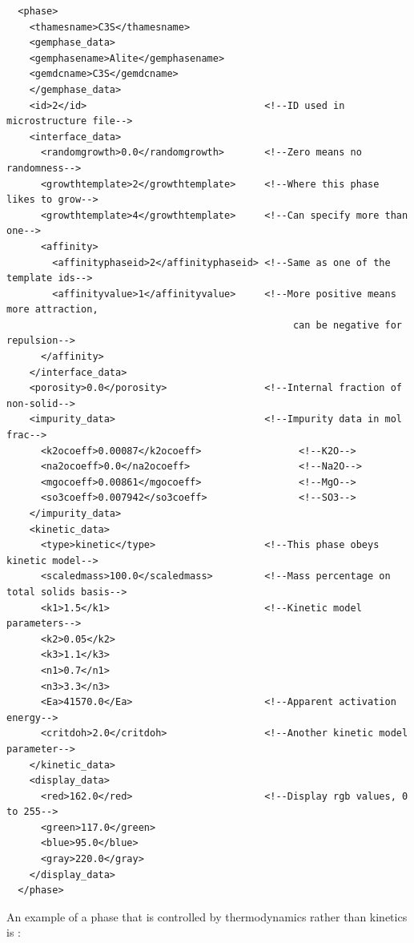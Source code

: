 \documentclass{article}
\begin{document}
\scriptsize{
    \begin{lstlisting}
  <phase>
    <thamesname>C3S</thamesname>
    <gemphase_data>
    <gemphasename>Alite</gemphasename>
    <gemdcname>C3S</gemdcname>
    </gemphase_data>
    <id>2</id>                               <!--ID used in microstructure file-->
    <interface_data>
      <randomgrowth>0.0</randomgrowth>       <!--Zero means no randomness-->
      <growthtemplate>2</growthtemplate>     <!--Where this phase likes to grow-->
      <growthtemplate>4</growthtemplate>     <!--Can specify more than one-->
      <affinity>
        <affinityphaseid>2</affinityphaseid> <!--Same as one of the template ids-->
        <affinityvalue>1</affinityvalue>     <!--More positive means more attraction,
                                                  can be negative for repulsion-->
      </affinity>
    </interface_data>
    <porosity>0.0</porosity>                 <!--Internal fraction of non-solid-->
    <impurity_data>                          <!--Impurity data in mol frac-->
      <k2ocoeff>0.00087</k2ocoeff>                 <!--K2O-->
      <na2ocoeff>0.0</na2ocoeff>                   <!--Na2O-->
      <mgocoeff>0.00861</mgocoeff>                 <!--MgO-->
      <so3coeff>0.007942</so3coeff>                <!--SO3-->
    </impurity_data>
    <kinetic_data>
      <type>kinetic</type>                   <!--This phase obeys kinetic model-->
      <scaledmass>100.0</scaledmass>         <!--Mass percentage on total solids basis-->
      <k1>1.5</k1>                           <!--Kinetic model parameters-->
      <k2>0.05</k2>
      <k3>1.1</k3>
      <n1>0.7</n1>
      <n3>3.3</n3>
      <Ea>41570.0</Ea>                       <!--Apparent activation energy-->
      <critdoh>2.0</critdoh>                 <!--Another kinetic model parameter-->
    </kinetic_data>
    <display_data>
      <red>162.0</red>                       <!--Display rgb values, 0 to 255-->
      <green>117.0</green>
      <blue>95.0</blue>
      <gray>220.0</gray>
    </display_data>
  </phase>
    \end{lstlisting}
}

\normalsize{ }
An example of a phase that is controlled by thermodynamics rather than
kinetics is :
\end{document}
